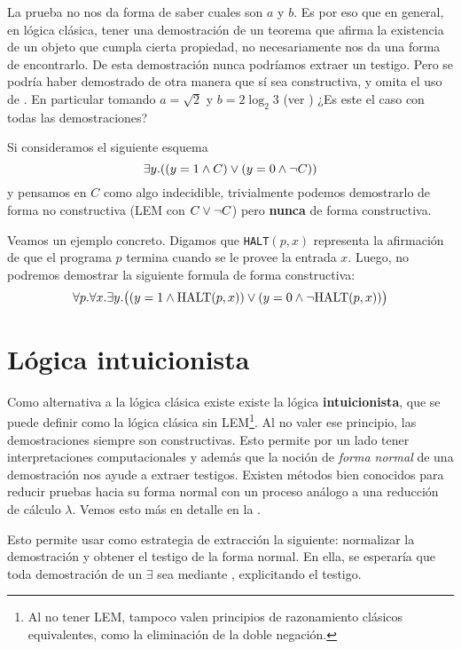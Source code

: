 La prueba no nos da forma de saber cuales son $a$ y $b$. Es por eso que en
general, en lógica clásica, tener una demostración de un teorema que afirma la
existencia de un objeto que cumpla cierta propiedad, no necesariamente nos da
una forma de encontrarlo. De esta demostración nunca podríamos extraer un testigo. Pero se podría haber demostrado de otra manera que sí sea constructiva, y omita el uso de . En particular tomando $a = \sqrt{2}$ y $b = 2 \log_2{3}$ (ver \cite{andrej-constructive}) ¿Es este el caso con todas las demostraciones?

\begin{ejemplo}
    Si consideramos el siguiente esquema
    \[
        \exists y . ((y = 1 \wedge C) \vee (y = 0 \wedge \neg C))
    \]
    y pensamos en $C$ como algo indecidible, trivialmente podemos demostrarlo de
    forma no constructiva (LEM con $C \vee \neg C$) pero \textbf{nunca} de
    forma constructiva.

    Veamos un ejemplo concreto. Digamos que \texttt{HALT}$(p ,x)$ representa la afirmación de que el programa $p$ termina cuando se le provee la entrada $x$. Luego, no podremos demostrar la siguiente formula de forma constructiva:
    \[
        \forall p . \forall x . \exists y .
        \big(
            (y = 1 \wedge \textrm{HALT}(p, x))
            \vee
            (y = 0 \wedge \neg \textrm{HALT}(p, x))
        \big)
    \]
\end{ejemplo}

\section{Lógica intuicionista}

Como alternativa a la lógica clásica existe existe la lógica
\textbf{intuicionista}, que se puede definir como la lógica clásica sin
LEM\footnote{Al no tener LEM, tampoco valen principios de razonamiento clásicos
equivalentes, como la eliminación de la doble negación.}. Al no valer ese
principio, las demostraciones siempre son constructivas. Esto permite por un
lado tener interpretaciones computacionales y además que
la noción de \textit{forma normal} de una demostración nos ayude a extraer testigos. Existen métodos
bien conocidos para reducir pruebas hacia su forma normal con un proceso análogo
a una reducción de cálculo $\lambda$. Vemos esto más en detalle en la .

Esto permite usar como estrategia de extracción la siguiente: normalizar la
demostración y obtener el testigo de la forma normal. En ella, se esperaría que
toda demostración de un $\exists$ sea mediante , explicitando el
testigo.

